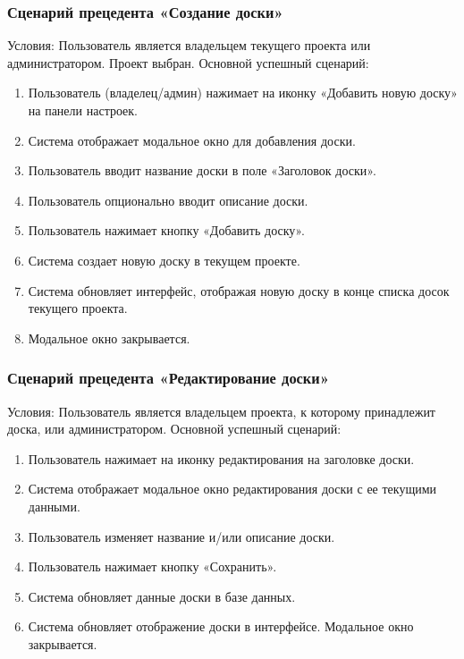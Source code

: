 \subsubsection{Сценарий прецедента «Создание доски»}
Условия: Пользователь является владельцем текущего проекта или администратором. Проект выбран.
Основной успешный сценарий:
\begin{enumerate}
	\item Пользователь (владелец/админ) нажимает на иконку «Добавить новую доску» на панели настроек.
	\item Система отображает модальное окно для добавления доски.
	\item Пользователь вводит название доски в поле «Заголовок доски».
	\item Пользователь опционально вводит описание доски.
	\item Пользователь нажимает кнопку «Добавить доску».
	\item Система создает новую доску в текущем проекте.
	\item Система обновляет интерфейс, отображая новую доску в конце списка досок текущего проекта.
	\item Модальное окно закрывается.
\end{enumerate}

\subsubsection{Сценарий прецедента «Редактирование доски»}
Условия: Пользователь является владельцем проекта, к которому принадлежит доска, или администратором.
Основной успешный сценарий:
\begin{enumerate}
	\item Пользователь нажимает на иконку редактирования на заголовке доски.
	\item Система отображает модальное окно редактирования доски с ее текущими данными.
	\item Пользователь изменяет название и/или описание доски.
	\item Пользователь нажимает кнопку «Сохранить».
	\item Система обновляет данные доски в базе данных.
	\item Система обновляет отображение доски в интерфейсе. Модальное окно закрывается.
\end{enumerate}

